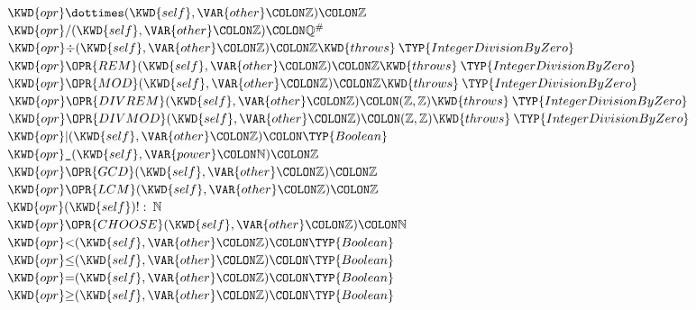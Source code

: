 \begin{Fortress}
\(  \KWD{opr} \mathord{\dottimes}(\KWD{self}, \VAR{other}\COLON \mathbb{Z})\COLON \mathbb{Z}\)\\
\(  \KWD{opr} /(\KWD{self}, \VAR{other}\COLON \mathbb{Z})\COLON \mathbb{Q}^{\#}\)\\
\(  \KWD{opr} \mathord{\div}(\KWD{self}, \VAR{other}\COLON \mathbb{Z})\COLON \mathbb{Z} \KWD{throws}\mskip 4mu plus 4mu\TYP{IntegerDivisionByZero}\)\\
\(  \KWD{opr} \mathord{\OPR{REM}}(\KWD{self}, \VAR{other}\COLON \mathbb{Z})\COLON \mathbb{Z} \KWD{throws}\mskip 4mu plus 4mu\TYP{IntegerDivisionByZero}\)\\
\(  \KWD{opr} \mathord{\OPR{MOD}}(\KWD{self}, \VAR{other}\COLON \mathbb{Z})\COLON \mathbb{Z} \KWD{throws}\mskip 4mu plus 4mu\TYP{IntegerDivisionByZero}\)\\
\(  \KWD{opr} \mathord{\OPR{DIVREM}}(\KWD{self}, \VAR{other}\COLON \mathbb{Z})\COLON (\mathbb{Z},\mathbb{Z}) \KWD{throws}\mskip 4mu plus 4mu\TYP{IntegerDivisionByZero}\)\\
\(  \KWD{opr} \mathord{\OPR{DIVMOD}}(\KWD{self}, \VAR{other}\COLON \mathbb{Z})\COLON (\mathbb{Z},\mathbb{Z}) \KWD{throws}\mskip 4mu plus 4mu\TYP{IntegerDivisionByZero}\)\\
\(  \KWD{opr} \mathord{\mid} (\KWD{self}, \VAR{other}\COLON \mathbb{Z})\COLON \TYP{Boolean}\)\\
\(  \KWD{opr} \mathord{\hbox{\tt\char'137}}(\KWD{self}, \VAR{power}\COLON \mathbb{N})\COLON \mathbb{Z}\)\\
\(  \KWD{opr} \mathord{\OPR{GCD}}(\KWD{self}, \VAR{other}\COLON \mathbb{Z})\COLON \mathbb{Z}\)\\
\(  \KWD{opr} \mathord{\OPR{LCM}}(\KWD{self}, \VAR{other}\COLON \mathbb{Z})\COLON \mathbb{Z}\)\\
\(  \KWD{opr} (\KWD{self})! \mathrel{\mathtt{:}}\mskip 4mu plus 4mu\mathbb{N}\)\\
\(  \KWD{opr} \mathord{\OPR{CHOOSE}}(\KWD{self}, \VAR{other}\COLON \mathbb{Z})\COLON \mathbb{N}\)\\
\(  \KWD{opr} \mathord{<}(\KWD{self}, \VAR{other}\COLON \mathbb{Z})\COLON \TYP{Boolean}\)\\
\(  \KWD{opr} \mathord{\leq}(\KWD{self}, \VAR{other}\COLON \mathbb{Z})\COLON \TYP{Boolean}\)\\
\(  \KWD{opr} \mathord{=}(\KWD{self}, \VAR{other}\COLON \mathbb{Z})\COLON \TYP{Boolean}\)\\
\(  \KWD{opr} \mathord{\geq}(\KWD{self}, \VAR{other}\COLON \mathbb{Z})\COLON \TYP{Boolean}\)\\

\end{Fortress}
